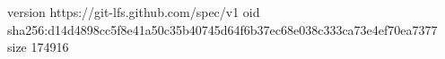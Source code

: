 version https://git-lfs.github.com/spec/v1
oid sha256:d14d4898cc5f8e41a50c35b40745d64f6b37ec68e038c333ca73e4ef70ea7377
size 174916
